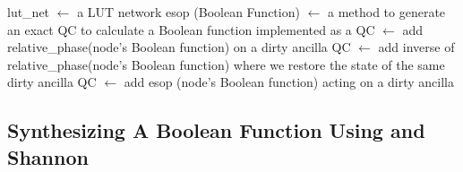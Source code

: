 \documentclass[paper]{ieice}
\providecommand{\DIFadd}[1]{{\protect\color{blue}{#1}}} %
\providecommand{\DIFaddbegin}{} %
\providecommand{\DIFaddend}{} %
\newcommand{\DIFaddincludegraphics}[2][]{{\color{blue}\fbox{\DIFOincludegraphics[#1]{#2}}}} %
\DeclareRobustCommand{\DIFaddbegin}{\DIFOaddbegin \let\includegraphics\DIFaddincludegraphics} %
\DeclareRobustCommand{\DIFaddend}{\DIFOaddend \let\includegraphics\DIFOincludegraphics} %
\begin{document}


\begin{algorithm}[tb]
  \caption{lut\_synthesis}
  \label{algo-lut}
  \begin{algorithmic}
    \State lut\_net $\leftarrow$ a LUT network
    \State esop (Boolean Function) $\leftarrow$ a method to generate
    an exact QC to calculate a Boolean function implemented as a  \DIFaddbegin \DIFadd{FCNOT gate 
    }\State \DIFadd{node\_traversal $\leftarrow$ a method to traverse lut\_net
    }\While {\DIFadd{node\_traversal returns a valid node}}
    \DIFaddend {}
    \State QC $\leftarrow$ add relative\_phase(node's Boolean function) \DIFaddbegin \DIFadd{acting }\DIFaddend on a dirty ancilla
    \State QC $\leftarrow$ add inverse of relative\_phase(node's 
    Boolean function) where we restore the state of the same dirty ancilla
    \State QC $\leftarrow$ add esop (node's Boolean function) acting on a dirty ancilla
    \EndIf
     \DIFaddbegin \EndWhile
  \DIFaddend \end{algorithmic}
\end{algorithm}

\subsection{Synthesizing A Boolean Function Using  \DIFaddbegin \DIFadd{Boolean logic networks }\DIFaddend and Shannon \DIFaddbegin \DIFadd{'s decomposition }\DIFaddend }
\end{document}
